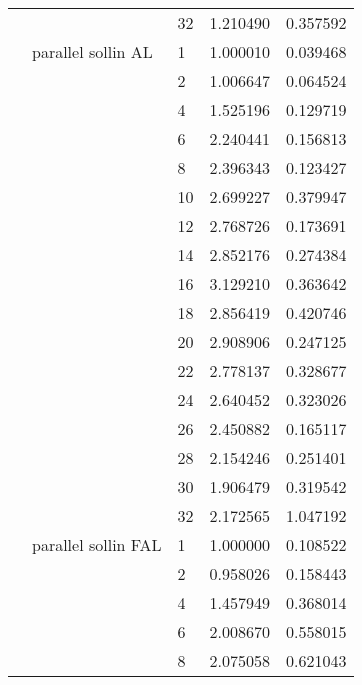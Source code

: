 \begin{tabular}{lllrr}
                      &                     & 32 &  1.210490 &  0.357592 \\
                      & parallel sollin AL & 1  &  1.000010 &  0.039468 \\
                      &                     & 2  &  1.006647 &  0.064524 \\
                      &                     & 4  &  1.525196 &  0.129719 \\
                      &                     & 6  &  2.240441 &  0.156813 \\
                      &                     & 8  &  2.396343 &  0.123427 \\
                      &                     & 10 &  2.699227 &  0.379947 \\
                      &                     & 12 &  2.768726 &  0.173691 \\
                      &                     & 14 &  2.852176 &  0.274384 \\
                      &                     & 16 &  3.129210 &  0.363642 \\
                      &                     & 18 &  2.856419 &  0.420746 \\
                      &                     & 20 &  2.908906 &  0.247125 \\
                      &                     & 22 &  2.778137 &  0.328677 \\
                      &                     & 24 &  2.640452 &  0.323026 \\
                      &                     & 26 &  2.450882 &  0.165117 \\
                      &                     & 28 &  2.154246 &  0.251401 \\
                      &                     & 30 &  1.906479 &  0.319542 \\
                      &                     & 32 &  2.172565 &  1.047192 \\
                      & parallel sollin FAL & 1  &  1.000000 &  0.108522 \\
                      &                     & 2  &  0.958026 &  0.158443 \\
                      &                     & 4  &  1.457949 &  0.368014 \\
                      &                     & 6  &  2.008670 &  0.558015 \\
                      &                     & 8  &  2.075058 &  0.621043 \\

\end{tabular}
